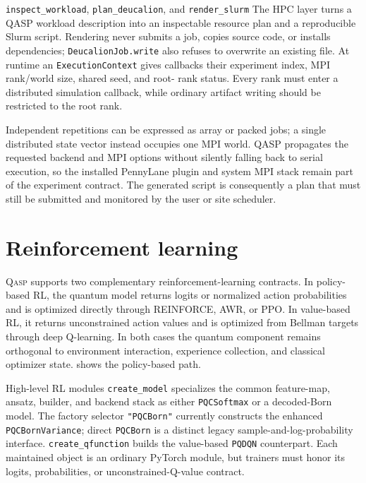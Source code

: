 \documentclass[10pt]{article}
\newcommand{\qasp}{\textsc{Qasp}}
\newcommand{\code}[1]{\texttt{#1}}
\begin{document}
\begin{qaspfeature}{\code{inspect\_workload}, \code{plan\_deucalion}, and \code{render\_slurm}}
The HPC layer turns a QASP workload description into an inspectable resource
plan and a reproducible Slurm script.  Rendering never submits a job, copies
source code, or installs dependencies; \code{DeucalionJob.write} also refuses
to overwrite an existing file.  At runtime an \code{ExecutionContext} gives
callbacks their experiment index, MPI rank/world size, shared seed, and root-
rank status.  Every rank must enter a distributed simulation callback, while
ordinary artifact writing should be restricted to the root rank.
\end{qaspfeature}

Independent repetitions can be expressed as array or packed jobs; a single
distributed state vector instead occupies one MPI world.  QASP propagates the
requested backend and MPI options without silently falling back to serial
execution, so the installed PennyLane plugin and system MPI stack remain part
of the experiment contract.  The generated script is consequently a plan that
must still be submitted and monitored by the user or site scheduler.

\section{Reinforcement learning}
\label{sec:rl}

\qasp{} supports two complementary reinforcement-learning contracts.  In
policy-based RL, the quantum model returns logits or normalized action
probabilities and is optimized directly through REINFORCE, AWR, or PPO.  In
value-based RL, it returns unconstrained action values and is optimized from
Bellman targets through deep Q-learning.  In both cases the quantum component
remains orthogonal to environment interaction, experience collection, and
classical optimizer state.   shows the policy-based path.

\begin{qaspfeature}{High-level RL modules}
\code{create\_model} specializes the common feature-map, ansatz, builder, and
backend stack as either \code{PQCSoftmax} or a decoded-Born model.  The factory
selector \code{"PQCBorn"} currently constructs the enhanced
\code{PQCBornVariance}; direct \code{PQCBorn} is a distinct legacy
sample-and-log-probability interface.  \code{create\_qfunction} builds the
value-based \code{PQDQN} counterpart.  Each maintained object is an ordinary
PyTorch module, but trainers must honor its logits, probabilities, or
unconstrained-Q-value contract.
\end{qaspfeature}
\end{document}
